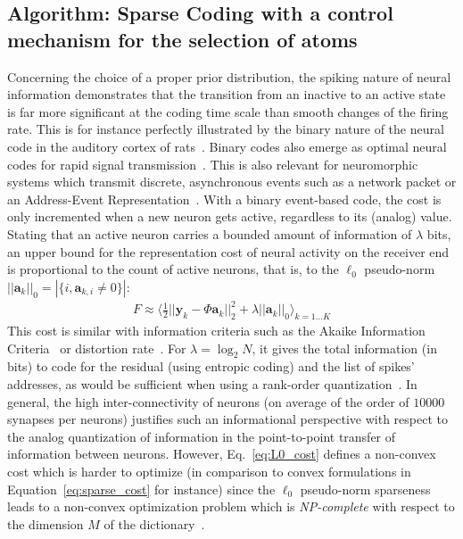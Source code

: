 \documentclass[vision,article,submit,oneauthor,pdftex]{Definitions/mdpi}
\newcommand{\coef}{\mathbf{a}} %
\newcommand{\image}{\mathbf{y}} %
\newcommand{\dico}{\Phi} %
\newcommand{\enscond}[2]{\lbrace #1, #2 \rbrace}
\newcommand{\norm}[1]{|\!| #1 |\!|}
\newcommand{\abs}[1]{\left|#1\right|}
\newcommand{\seeEq}[1]{Eq.~\ref{eq:#1}}%
\begin{document}
\subsection{Algorithm: Sparse Coding with a control mechanism for the selection of atoms}
Concerning the choice of a proper prior distribution, the spiking nature of neural information demonstrates that the transition from an inactive to an active state is far more significant at the coding time scale than smooth changes of the firing rate. This is for instance perfectly illustrated by the binary nature of the neural code in the auditory cortex of rats~\citep{DeWeese03}. Binary codes also emerge as optimal neural codes for rapid signal transmission~\citep{Bethge03}. This is also relevant for neuromorphic systems which transmit discrete, asynchronous events such as a network packet or an Address-Event Representation~\citep{Khoei19}. With a binary event-based code, the cost is only incremented when a new neuron gets active, regardless to its (analog) value. Stating that an active neuron carries a bounded amount of information of $\lambda$ bits, an upper bound for the representation cost of neural activity on the receiver end is proportional to the count of active neurons, that is, to the $\ell_0$ pseudo-norm $\norm{\coef_{k}}_0 = \abs{\enscond{i}{\coef_{k, i} \neq 0}}$:%
\begin{align}%
F \approx  \langle \frac{1}{2} \norm{\image_k - \dico \coef_{k}}_2^2 + \lambda\norm{\coef_{k}}_0 \rangle_{k = 1 \ldots K}%
\label{eq:L0_cost}%
\end{align}%
This cost is similar with information criteria such as the Akaike Information Criteria~\citep{Akaike74} or distortion rate~\cite[p.~571]{Mallat98}. For $\lambda=\log_2 N$, it gives the total information (in bits) to code for the residual (using entropic coding) and the list of spikes' addresses, as would be sufficient when using a rank-order quantization~\citep{Perrinet03ieee}. In general, the high inter-connectivity of neurons (on average of the order of $10000$ synapses per neurons) justifies such an informational perspective with respect to the analog quantization of information in the point-to-point transfer of information between neurons.
However, \seeEq{L0_cost} defines a non-convex cost which is harder to optimize (in comparison to convex formulations in Equation~\ref{eq:sparse_cost} for instance) since the $\ell_0$ pseudo-norm sparseness leads to a non-convex optimization problem which is \emph{NP-complete} with respect to the dimension $M$ of the dictionary~\cite[p.~418]{Mallat98}.
\end{document}
